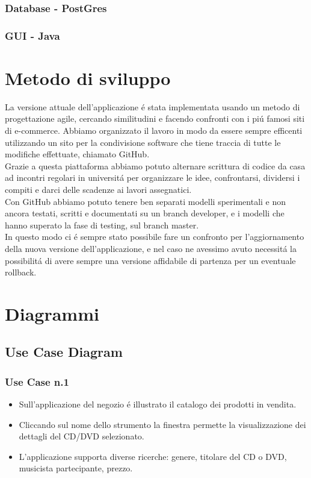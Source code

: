 \documentclass[a4paper,titlepage]{book}
\begin{document}
\subsection{Database -  PostGres}
\subsection{GUI -  Java}

\chapter{Metodo di sviluppo}
La versione attuale dell'applicazione \'e stata implementata usando un metodo di progettazione agile, cercando similitudini e 
facendo confronti con i pi\'u famosi siti di e-commerce. Abbiamo organizzato il lavoro in modo da essere sempre efficenti utilizzando
un sito per la condivisione software che tiene traccia di tutte le modifiche effettuate, chiamato GitHub.\\
Grazie a questa piattaforma abbiamo potuto alternare scrittura di codice da casa ad incontri regolari in universit\'a per organizzare
le idee, confrontarsi, dividersi i compiti e darci delle scadenze ai lavori assegnatici.\\
Con GitHub abbiamo potuto tenere ben separati modelli sperimentali e non ancora testati, scritti e documentati su un branch developer, e i modelli che hanno superato la fase di testing, sul branch master.\\
In questo modo ci \'e sempre stato possibile fare un confronto per l'aggiornamento della nuova versione dell'applicazione,
e nel caso ne avessimo avuto necessit\'a la possibilit\'a di avere sempre una versione affidabile di partenza per un eventuale rollback.

\chapter{Diagrammi}
\section{Use Case Diagram}
\subsection{Use Case n.1}
\begin{itemize}
\item Sull'applicazione del negozio \'e illustrato il catalogo dei prodotti in vendita.
\item Cliccando sul nome dello strumento la finestra permette la visualizzazione dei dettagli del CD/DVD selezionato.
\item L'applicazione supporta diverse ricerche: genere, titolare del CD o DVD, musicista partecipante, prezzo.
\end{itemize}
\end{document}
